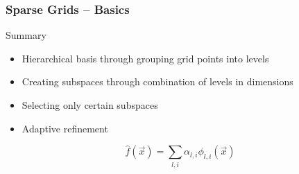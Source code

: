 \begin{frame}
  \frametitle{Sparse Grids -- Basics}
  \topline
  \vspace{-10px}
  \begin{block}{Summary}
    \begin{itemize}
      \item Hierarchical basis through grouping grid points into levels
      \item Creating subspaces through combination of levels in dimensions
      \item Selecting only certain subspaces
      \item Adaptive refinement
      \end{itemize}
      \vspace{20px}
      $$\hat{f}(\vec{x}) = \sum_{l,i}{\alpha_{l,i} \phi_{l,i}(\vec{x})} $$
  \end{block}
\end{frame}

